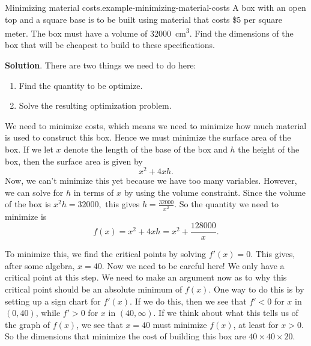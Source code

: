 \documentclass[10pt,]{book}
\numberwithin{equation}{section}
\begin{document}
\begin{example}{Minimizing material costs.}{example-minimizing-material-costs}%
\hypertarget{p-358}{}%
A box with an open top and a square base is to be built using material that costs \$5 per square meter. The box must have a volume of \SI{32000}{\centi\meter\tothe{3}}. Find the dimensions of the box that will be cheapest to build to these specifications.%
\par\smallskip%
\noindent\textbf{Solution}.\hypertarget{solution-79}{}\quad%
\hypertarget{p-359}{}%
There are two things we need to do here: \leavevmode%
\begin{enumerate}
\item\hypertarget{li-24}{}Find the quantity to be optimize.%
\item\hypertarget{li-25}{}Solve the resulting optimization problem.%
\end{enumerate}
 We need to minimize costs, which means we need to minimize how much material is used to construct this box. Hence we must minimize the surface area of the box. If we let \(x\) denote the length of the base of the box and \(h\) the height of the box, then the surface area is given by%
\begin{equation*}
x^{2} + 4xh.
\end{equation*}
Now, we can't minimize this yet because we have too many variables. However, we can solve for \(h\) in terms of \(x\) by using the volume constraint. Since the volume of the box is \(x^{2}h = 32000,\) this gives \(h = \frac{32000}{x^{2}}.\) So the quantity we need to minimize is%
\begin{equation*}
f(x) = x^{2} + 4xh = x^{2} + \frac{128000}{x}.
\end{equation*}
%
\par
\hypertarget{p-360}{}%
To minimize this, we find the critical points by solving \(f'(x) = 0\). This gives, after some algebra, \(x = 40\). Now we need to be careful here! We only have a critical point at this step. We need to make an argument now as to why this critical point should be an absolute minimum of \(f(x)\). One way to do this is by setting up a sign chart for \(f'(x)\). If we do this, then we see that \(f' < 0\) for \(x\) in \((0,40)\), while \(f' > 0\) for \(x\) in \((40,\infty)\). If we think about what this tells us of the graph of \(f(x)\), we see that \(x=40\) must minimize \(f(x)\), at least for \(x > 0\). So the dimensions that minimize the cost of building this box are \(40\times40\times20\).%
\end{example}
\end{document}
